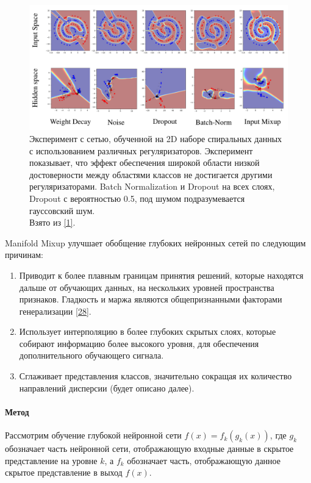 \begin{figure}
    \centering
    \includegraphics[scale=0.25]{./images/mixup.png}
    \caption{\protect\hypertarget{image10}{Эксперимент с сетью, обученной на 2D наборе спиральных данных с использованием различных регуляризаторов. Эксперимент показывает, что эффект обеспечения широкой области низкой достоверности между областями классов не достигается другими регуляризаторами. Batch Normalization и Dropout на всех слоях, Dropout с вероятностью 0.5, под шумом подразумевается гауссовский шум.
 \\ Взято из \protect\hyperlink{cite.Ver18}{[1]}.}}
\end{figure}

Manifold Mixup улучшает обобщение глубоких нейронных сетей по следующим причинам:
\begin{enumerate}
\item Приводит к более плавным границам принятия решений, которые находятся дальше от обучающих данных, на нескольких уровней пространства признаков. Гладкость и маржа являются общепризнанными факторами генерализации \hyperlink{cite.Pet98}{[28]}.  
\item Использует интерполяцию в более глубоких скрытых слоях, которые собирают информацию более высокого уровня, для обеспечения дополнительного обучающего сигнала.
\item Сглаживает представления классов, значительно сокращая их количество направлений дисперсии (будет описано далее).
\end{enumerate}

\paragraph{Метод}
Рассмотрим обучение глубокой нейронной сети $f(x) = f_k(g_k(x))$, где $g_k$ обозначает часть нейронной сети, отображающую входные данные в скрытое представление на уровне $k$, а $f_k$ обозначает часть, отображающую данное скрытое представление в выход $f(x)$. 

